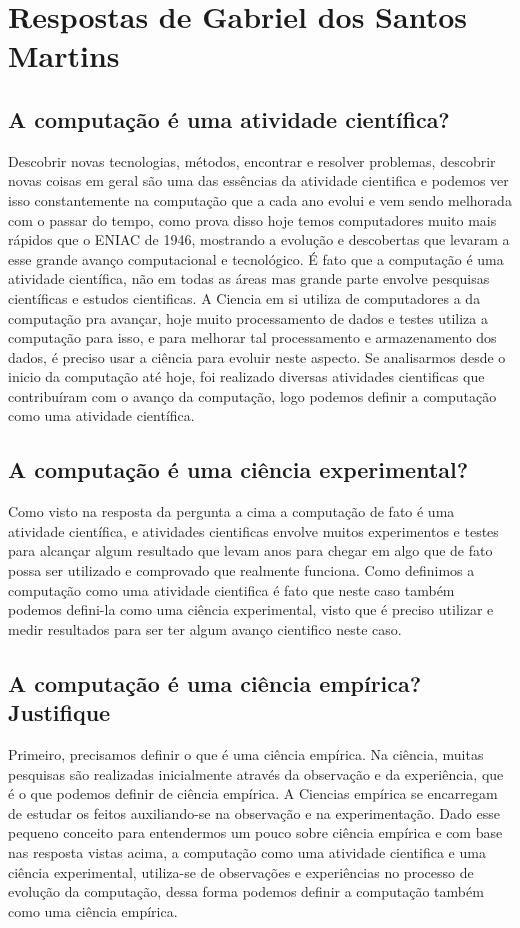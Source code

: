 \section{Respostas de Gabriel dos Santos Martins}

\subsection{A computação é uma atividade científica?}
Descobrir novas tecnologias, métodos, encontrar e resolver problemas, descobrir novas coisas em geral são uma das essências da atividade cientifica e podemos ver isso constantemente na computação que a cada ano evolui e vem sendo melhorada com o passar do tempo, como prova disso hoje temos computadores muito mais rápidos que o ENIAC de 1946, mostrando a evolução e descobertas que levaram a esse grande avanço computacional e tecnológico. É fato que a computação é uma atividade científica, não em todas as áreas mas grande parte envolve pesquisas científicas e estudos cientificas. A \gls{Ciencia} em si utiliza de computadores a da computação pra avançar, hoje muito processamento de dados e testes utiliza a computação para isso, e para melhorar tal processamento e armazenamento dos dados, é preciso usar a ciência para evoluir neste aspecto. 
Se analisarmos desde o inicio da computação até hoje, foi realizado diversas atividades cientificas que contribuíram com o avanço da computação, logo podemos definir a computação como uma atividade científica.

\subsection{A computação é uma ciência experimental?}
Como visto na resposta da pergunta a cima a computação de fato é uma atividade científica, e atividades cientificas envolve muitos experimentos e testes para alcançar algum resultado que levam anos para chegar em algo que de fato possa ser utilizado e comprovado que realmente funciona. Como definimos a computação como uma atividade cientifica é fato que neste caso também podemos defini-la como uma ciência experimental, visto que é preciso utilizar e medir resultados para ser ter algum avanço cientifico neste caso. 

\subsection{A computação é uma ciência empírica? Justifique}
Primeiro, precisamos definir o que é uma ciência empírica. Na ciência, muitas pesquisas são realizadas inicialmente através da observação e da experiência, que é o que podemos definir de ciência empírica. A 
Ciencias
empírica se encarregam de estudar os feitos auxiliando-se na observação e na experimentação. 
Dado esse pequeno conceito para entendermos um pouco sobre ciência empírica e com base nas resposta vistas acima, a computação como uma atividade cientifica e uma ciência experimental, utiliza-se de observações e experiências no processo de evolução da computação, dessa forma podemos definir a computação também como uma ciência empírica. 
